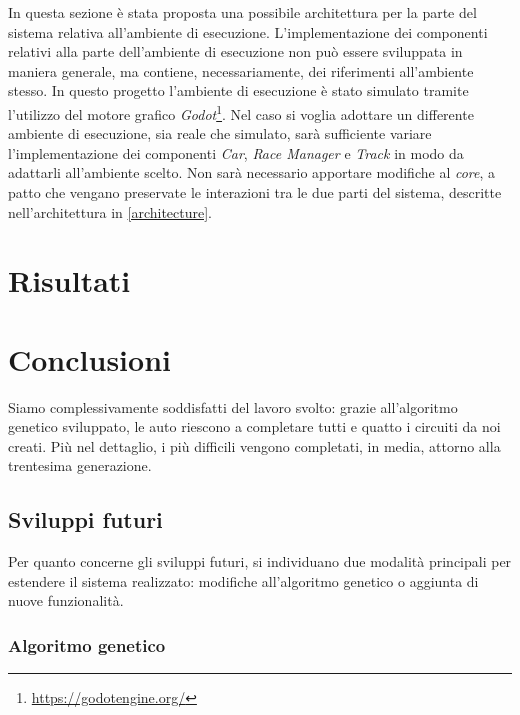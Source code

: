 \documentclass[a4paper,12pt]{article}
\begin{document}
In questa sezione è stata proposta una possibile architettura per la parte del sistema relativa all'ambiente di esecuzione. L'implementazione dei componenti relativi alla parte dell'ambiente di esecuzione non può essere sviluppata in maniera generale, ma contiene, necessariamente, dei riferimenti all'ambiente stesso. In questo progetto l'ambiente di esecuzione è stato simulato tramite l'utilizzo del motore grafico \emph{Godot}\footnote{\url{https://godotengine.org/}}. Nel caso si voglia adottare un differente ambiente di esecuzione, sia reale che simulato, sarà sufficiente variare l'implementazione dei componenti \emph{Car}, \emph{Race Manager} e \emph{Track} in modo da adattarli all'ambiente scelto. Non sarà necessario apportare modifiche al \emph{core}, a patto che vengano preservate le interazioni tra le due parti del sistema, descritte nell'architettura in \autoref{architecture}.

\section{Risultati} \label{risultati}

\section{Conclusioni} \label{conclusions}

Siamo complessivamente soddisfatti del lavoro svolto: grazie all'algoritmo genetico sviluppato, le auto riescono a completare tutti e quatto i circuiti da noi creati. Più nel dettaglio, i più difficili vengono completati, in media, attorno alla trentesima generazione.

\subsection*{Sviluppi futuri}

Per quanto concerne gli sviluppi futuri, si individuano due modalità principali per estendere il sistema realizzato: modifiche all'algoritmo genetico o aggiunta di nuove funzionalità.

\subsubsection*{Algoritmo genetico} 
\end{document}
